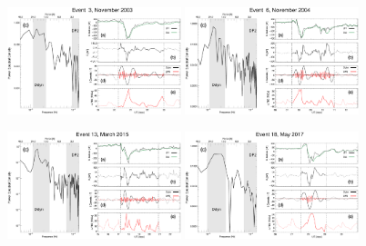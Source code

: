 \documentclass[a4paper,fleqn]{cas-dc}
\begin{document}
\begin{figure}[h!]
	\centering
	\centerline{\Large \bf   
		\hfill}
	\centerline{\Large \bf   
		\hspace{0.26\textwidth}  \color{black}{}
		\hspace{0.31\textwidth}  \color{black}{}
		\hfill}
	\includegraphics[width=0.45\textwidth]{images/diono/iono_PI_2003-11-19.eps}
	\includegraphics[width=0.45\textwidth]{images/diono/iono_PI_2004-11-06.eps}

	\centerline{\Large \bf   
	\hspace{0.26\textwidth}  \color{black}{}
	\hspace{0.31\textwidth}  \color{black}{}
	\hfill}	   
	\includegraphics[width=0.45\textwidth]{images/diono/iono_PI_2015-03-15.eps}
    \includegraphics[width=0.45\textwidth]{images/diono/iono_PI_2017-05-26.eps}   	
    

\end{figure}
\end{document}
